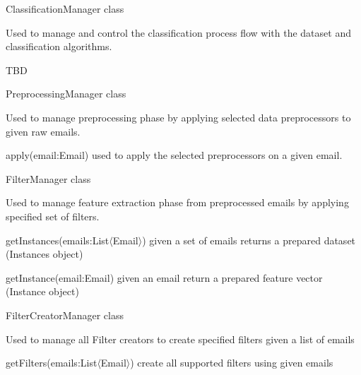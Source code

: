 \begin{my_itemize}
  \item ClassificationManager class
  \begin{my_desc}
    \item[Purpose] Used to manage and control the classification process flow
      with the dataset and classification algorithms.
    \item[Functions] TBD
  \end{my_desc}
  \item PreprocessingManager class
  \begin{my_desc}
    \item[Purpose] Used to manage preprocessing phase by applying selected data preprocessors
      to given raw emails.
    \item[Functions] \hfill
    \begin{my_itemize}
      \item apply(email:Email) used to apply the selected preprocessors on a given email.
    \end{my_itemize}
  \end{my_desc}

  \item FilterManager class
  \begin{my_desc}
    \item[Purpose] Used to manage feature extraction phase from preprocessed emails by applying
      specified set of filters.
    \item[Functions] \hfill
    \begin{my_itemize}
      \item getInstances(emails:List$\langle$Email$\rangle$) given a set of emails returns a prepared dataset (Instances object)
      \item getInstance(email:Email) given an email return a prepared feature vector (Instance object)
    \end{my_itemize}

  \end{my_desc}

  \item FilterCreatorManager class
  \begin{my_desc}
    \item[Purpose] Used to manage all Filter creators to create specified filters given a list of emails
    \item[Functions] \hfill
    \begin{my_itemize}
      \item getFilters(emails:List$\langle$Email$\rangle$) create all supported filters using given emails
    \end{my_itemize}


\end{my_desc}
\end{my_itemize}
